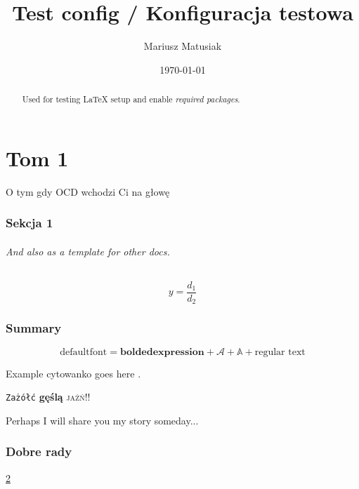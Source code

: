 \documentclass[12pt,a4paper,onecolumn]{article}
\title{Test config / Konfiguracja testowa}
\author{Mariusz Matusiak}
\date{\today}
\begin{document}
\maketitle

\begin{abstract}
    Used for testing \LaTeX{} setup and enable \emph{required packages}. 
\end{abstract}

\part{Tom 1}
O tym gdy OCD wchodzi Ci na głowę

\section{Sekcja 1}

\paragraph{And also as a template for other docs.}

\begin{equation}
    y = \frac{d_1}{d_2}
\end{equation}

\section{Summary}
\label{sec:summary}

\begin{equation}
    \mathrm{default font} = \mathbf{bolded expression} + \mathcal{A} + \mathbb{A} + \text{regular text}
\end{equation}

Example cytowanko goes here \cite{Matusiak2020m,Matusiak2020b}.

\texttt{Zażółć} \textbf{gęślą} \textsc{jaźń}!!

Perhaps I will share you my story someday...

\appendix \section{Dobre rady} \ref{sec:summary}

\ifx\UseBibLaTeX\undefined
    
    
\else
    \printbibliography{}
\fi

\tableofcontents
\end{document}
